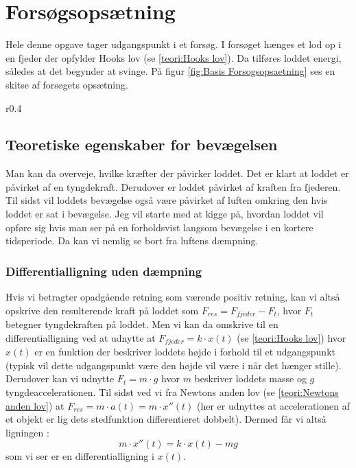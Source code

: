 \section{Forsøgsopsætning}
Hele denne opgave tager udgangspunkt i et forsøg.
I forsøget hænges et lod op i en fjeder der opfylder Hooks lov (se \ref{teori:Hooks lov}). 
Da tilføres loddet energi, således at det begynder at svinge. 
På figur \ref{fig:Basis Forsogsopsaetning} ses en skitse af forsøgets opsætning.

\begin{wrapfigure}{r}{0.4\textwidth}
\centering
{}%

\caption{Skitse af forsøgsopsætning.}
\label{fig:Basis Forsogsopsaetning}
\end{wrapfigure} 

\subsection{Teoretiske egenskaber for bevægelsen}
Man kan da overveje, hvilke kræfter der påvirker loddet. 
Det er klart at loddet er påvirket af en tyngdekraft. 
Derudover er loddet påvirket af kraften fra fjederen.
Til sidst vil loddets bevægelse også være påvirket af luften omkring den hvis loddet er sat i bevægelse. 
Jeg vil starte med at kigge på, hvordan loddet vil opføre sig hvis man ser på en forholdsvist langsom bevægelse i en kortere tidsperiode.
Da kan vi nemlig se bort fra luftens dæmpning. 

\subsubsection{Differentialligning uden dæmpning}\label{teori: Opstilling ligning uden dampning}
Hvis vi betragter opadgående retning som værende positiv retning, kan vi altså opskrive den resulterende kraft på loddet som $F_{res} = F_{fjeder}-F_{t}$, hvor $F_t$ betegner tyngdekraften på loddet. 
Men vi kan da omskrive til en differentialligning ved at udnytte at $F_{fjeder}=k \cdot x(t)$ (se \ref{teori:Hooks lov}) hvor $x(t)$ er en funktion der beskriver loddets højde i forhold til et udgangspunkt (typisk vil dette udgangspunkt være den højde vil være i når det hænger stille). 
Derudover kan vi udnytte $F_{t}=m\cdot g$ hvor $m$ beskriver loddets masse og $g$ tyngdeaccelerationen. 
Til sidst ved vi fra Newtons anden lov (se \ref{teori:Newtons anden lov}) at $F_{res}=m\cdot a(t) = m \cdot x''(t)$ 
(her er udnyttes at accelerationen af et objekt er lig dets stedfunktion differentieret dobbelt). 
Dermed får vi altså ligningen :
$$m\cdot x''(t)=k\cdot x(t)-mg$$ 
som vi ser er en differentialligning i $x(t)$.

